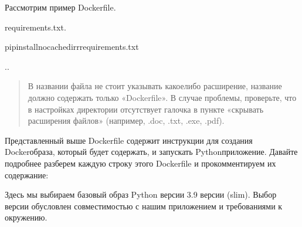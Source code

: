 \documentclass[letterpaper,10pt,russian]{sphinxmanual}
\begin{document}
\sphinxAtStartPar
Рассмотрим пример Dockerfile.

\begin{sphinxVerbatim}[commandchars=\\\{\}]


requirements.txt.

pipinstall\PYGZhy{}\PYGZhy{}no\PYGZhy{}cache\PYGZhy{}dir\PYGZhy{}rrequirements.txt

..

\PYG{p}{[}\PYG{p}{]}
\end{sphinxVerbatim}
\begin{quote}

\sphinxAtStartPar
В названии файла не стоит указывать какое\sphinxhyphen{}либо расширение, название должно содержать только «Dockerfile». В случае проблемы, проверьте, что в настройках директории отсутствует галочка в пункте «скрывать расширения файлов» (например, .doc, .txt, .exe, .pdf).
\end{quote}

\sphinxAtStartPar
Представленный выше Dockerfile содержит инструкции для создания Docker\sphinxhyphen{}образа, который будет содержать, и запускать Python\sphinxhyphen{}приложение. Давайте подробнее разберем каждую строку этого Dockerfile и прокомментируем их содержание:

\begin{sphinxVerbatim}[commandchars=\\\{\}]
\end{sphinxVerbatim}

\sphinxAtStartPar
Здесь мы выбираем базовый образ Python версии 3.9 версии (slim). Выбор версии обусловлен совместимостью с нашим приложением и требованиями к окружению.

\begin{sphinxVerbatim}[commandchars=\\\{\}]
\end{sphinxVerbatim}
\end{document}
